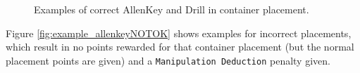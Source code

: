 \begin{figure}[h!]
	\begin{center}
		 \hfill
		 \hfill
		 \hfill
		 \hfill
	\end{center}
	\caption{Examples of correct AllenKey and Drill in container placement.}
	\label{fig:example_allenkeyOK}
\end{figure}

Figure \ref{fig:example_allenkeyNOTOK} shows examples for incorrect placements, which result in no points rewarded for that container placement (but the normal placement points are given) and a \texttt{Manipulation Deduction} penalty given.

